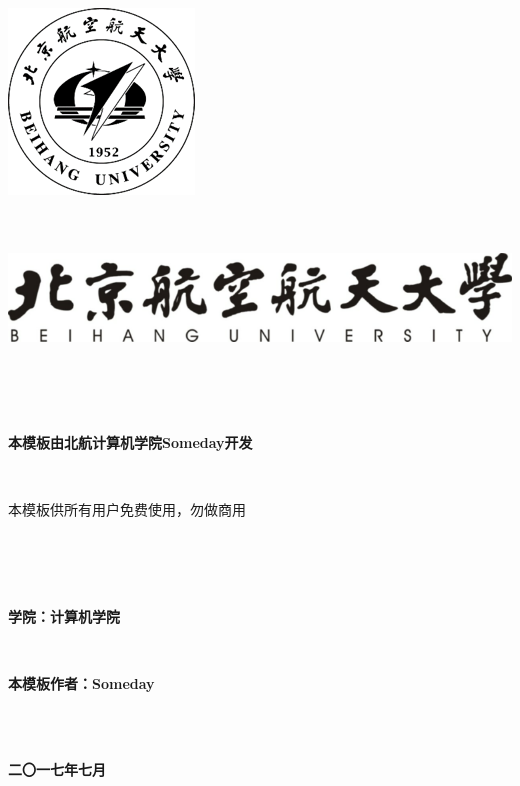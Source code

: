 \documentclass{ctexart}
\newcommand{\erhao}{\fontsize{21pt}{0}}
\newcommand{\sanhao}{\fontsize{15.75pt}{0}}
\newcommand{\sihao}{\fontsize{14pt}{0}}
\begin{document}
\lhead{}%
\rhead{}%


\setcounter{secnumdepth}{0}%





\includegraphics[scale=1]{include_picture/xiaohui.png}
\ \\ 
\ \\
\ \\
\begin{center}
\includegraphics[scale=1]{include_picture/xiaoming.png}
\end{center}
\ \\
\ \\
\ \\
\erhao
\centerline{\erhao\textbf{本模板由北航计算机学院Someday开发}} %
\ \\
\centerline{本模板供所有用户免费使用，勿做商用}
\ \\
\ \\
\ \\
\sihao
\centerline{\textbf{学院：计算机学院}}
\ \\
\centerline{\textbf{本模板作者：Someday}}


\ \\
\ \\ 
\sanhao
\centerline{\textbf{二〇一七年七月}}
\end{document}
